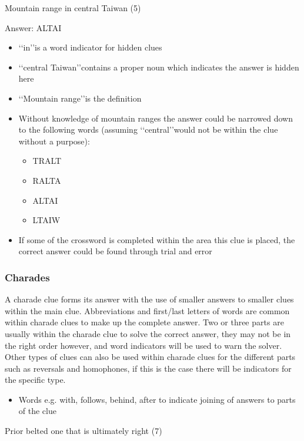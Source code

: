Mountain range in central Taiwan (5)  

Answer: ALTAI 

\begin{itemize}
	\item \lq\lq in\rq\rq is a word indicator for hidden clues 
	\item \lq\lq central Taiwan\rq\rq contains a proper noun which indicates the answer is hidden here 
 	\item \lq\lq Mountain range\rq\rq is the definition 
 	\item Without knowledge of mountain ranges the answer could be narrowed down to the following words (assuming \lq\lq central\rq\rq would not be within the clue without a purpose): 
	\begin{itemize}
		\item TRALT 
		\item RALTA 
		\item ALTAI 
		\item LTAIW
	\end{itemize} 
\item If some of the crossword is completed within the area this clue is placed, the correct answer could be found through trial and error 
\end{itemize}

\subsubsection{Charades}

A charade clue forms its answer with the use of smaller answers to smaller clues within the main clue. Abbreviations and first/last letters of words are common within charade clues to make up the complete answer. Two or three parts are usually within the charade clue to solve the correct answer, they may not be in the right order however, and word indicators will be used to warn the solver. Other types of clues can also be used within charade clues for the different parts such as reversals and homophones, if this is the case there will be indicators for the specific type.  

\begin{itemize}
	\item Words e.g. with, follows, behind, after to indicate joining of answers to parts of the clue 
\end{itemize}


Prior belted one that is ultimately right (7) 

